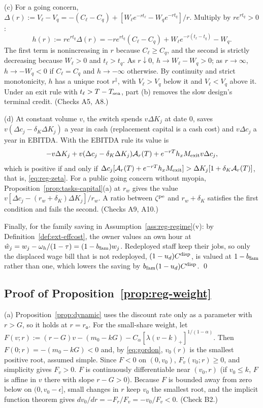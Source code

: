 (c) For a going concern, $\Delta(r):=V_\ell-V_q=-(C_\ell-C_q)+[W_\ell e^{-rt_\ell}-W_qe^{-rt_q}]/r$. Multiply by $re^{rt_q}>0$:
\[
h(r):=re^{rt_q}\Delta(r)=-re^{rt_q}(C_\ell-C_q)+W_\ell e^{-r(t_\ell-t_q)}-W_q .
\]
The first term is nonincreasing in $r$ because $C_\ell\ge C_q$, and the second is strictly decreasing because $W_\ell>0$ and $t_\ell>t_q$. As $r\downarrow0$, $h\to W_\ell-W_q>0$; as $r\to\infty$, $h\to-W_q<0$ if $C_\ell=C_q$ and $h\to-\infty$ otherwise. By continuity and strict monotonicity, $h$ has a unique root $r^\ddagger$, with $V_\ell>V_q$ below it and $V_\ell<V_q$ above it. Under an exit rule with $t_\ell>T-T_{\rm sea}$, part (b) removes the slow design's terminal credit. (Checks A5, A8.)

(d) At constant volume $v$, the switch spends $v\Delta K_j$ at date 0, saves $v(\Delta c_j-\delta_K\Delta K_j)$ a year in cash (replacement capital is a cash cost) and $v\Delta c_j$ a year in EBITDA. With the EBITDA rule its value is
\[
-v\Delta K_j+v(\Delta c_j-\delta_K\Delta K_j)\mathcal A_r(T)+e^{-rT}h_xM_{\rm exit}v\Delta c_j,
\]
which is positive if and only if $\Delta c_j[\mathcal A_r(T)+e^{-rT}h_xM_{\rm exit}]>\Delta K_j[1+\delta_K\mathcal A_r(T)]$, that is, \eqref{eq:reg-zeta}. For a public going concern without myopia, Proposition~\ref{prop:tasks-capital}(a) at $r_w$ gives the value $v[\Delta c_j-(r_w+\delta_K)\Delta K_j]/r_w$. A ratio between $\zeta^{\rm pe}$ and $r_w+\delta_K$ satisfies the first condition and fails the second. (Checks A9, A10.)

Finally, for the family saving in Assumption~\ref{ass:reg-regime}(v): by Definition~\ref{def:ext-effcost}, the owner values an own hour at $\hat w_j=w_j-\omega_h/(1-\tau)=(1-b_{\rm fam})w_j$. Redeployed staff keep their jobs, so only the displaced wage bill that is not redeployed, $(1-u_d)C^{\rm disp}$, is valued at $1-b_{\rm fam}$ rather than one, which lowers the saving by $b_{\rm fam}(1-u_d)C^{\rm disp}$. \qed

\subsection*{Proof of Proposition~\ref{prop:reg-weight}}

(a) Proposition~\ref{prop:dynamic} uses the discount rate only as a parameter with $r>G$, so it holds at $r=r_{\mathsf o}$. For the small-share weight, let $F(v;r):=(r-G)v-(m_0-kG)-C_\alpha[\lambda(v-k)_+]^{1/(1-\alpha)}$. Then $F(0;r)=-(m_0-kG)<0$ and, by \eqref{eq:gordon}, $v_0(r)$ is the smallest positive root, assumed simple. Since $F<0$ on $(0,v_0)$, $F_v(v_0;r)\ge0$, and simplicity gives $F_v>0$. $F$ is continuously differentiable near $(v_0,r)$ (if $v_0\le k$, $F$ is affine in $v$ there with slope $r-G>0$). Because $F$ is bounded away from zero below on $(0,v_0-\epsilon]$, small changes in $r$ keep $v_0$ the smallest root, and the implicit function theorem gives $dv_0/dr=-F_r/F_v=-v_0/F_v<0$. (Check B2.)

